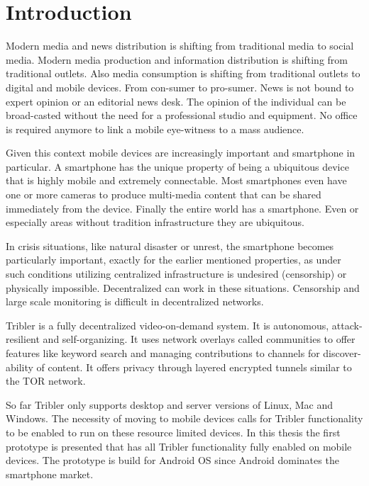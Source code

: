 \chapter{Introduction}\label{ch:intro}

Modern media and news distribution is shifting from traditional media to social media.
Modern media production and information distribution is shifting from traditional outlets.
Also media consumption is shifting from traditional outlets to digital and mobile devices.
From con-sumer to pro-sumer.
News is not bound to expert opinion or an editorial news desk.
The opinion of the individual can be broad-casted without the need for a professional studio and equipment.
No office is required anymore to link a mobile eye-witness to a mass audience.

Given this context mobile devices are increasingly important and smartphone in particular.
A smartphone has the unique property of being a ubiquitous device that is highly mobile and extremely connectable.
Most smartphones even have one or more cameras to produce multi-media content that can be shared immediately from the device.
Finally the entire world has a smartphone.
Even or especially areas without tradition infrastructure they are ubiquitous.

In crisis situations, like natural disaster or unrest, the smartphone becomes particularly important, exactly for the earlier mentioned properties, as under such conditions utilizing centralized infrastructure is undesired (censorship) or physically impossible.
Decentralized can work in these situations.
Censorship and large scale monitoring is difficult in decentralized networks.


Tribler is a fully decentralized video-on-demand system. \cite{TriblerOverviewJournal, tribler2014play, tribler-anon-hd}
It is autonomous, attack-resilient and self-organizing. \cite{votecast, tribler-gossip}
It uses network overlays called communities to offer features like keyword search and managing contributions to channels for discover-ability of content.
It offers privacy through layered encrypted tunnels similar to the TOR network.\cite{triber2014at3, dingledine2004tor, dingledine2006design}

So far Tribler only supports desktop and server versions of Linux, Mac and Windows.
The necessity of moving to mobile devices calls for Tribler functionality to be enabled to run on these resource limited devices.
In this thesis the first prototype is presented that has all Tribler functionality fully enabled on mobile devices.
The prototype is build for Android OS since Android dominates the smartphone market.



